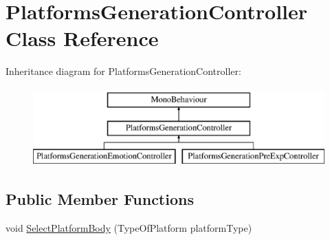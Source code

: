 \hypertarget{class_platforms_generation_controller}{}\section{Platforms\+Generation\+Controller Class Reference}
\label{class_platforms_generation_controller}
Inheritance diagram for Platforms\+Generation\+Controller\+:\begin{figure}[H]
\begin{center}
\leavevmode
\includegraphics[height=3.000000cm]{class_platforms_generation_controller}
\end{center}
\end{figure}
\subsection*{Public Member Functions}
\begin{DoxyCompactItemize}
\item 
void \mbox{\hyperlink{class_platforms_generation_controller_a7b47f9cbf87a95f755ef450b151ed031}{Select\+Platform\+Body}} (Type\+Of\+Platform platform\+Type)
\end{DoxyCompactItemize}
